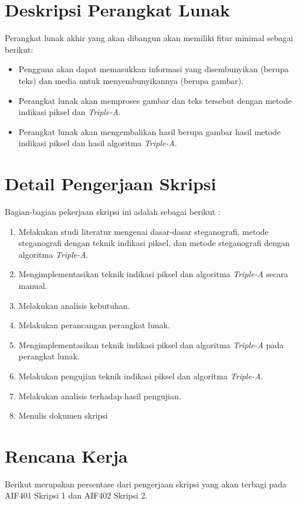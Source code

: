 \documentclass[a4paper,twoside]{article}
\begin{document}
\section{Deskripsi Perangkat Lunak}
Perangkat lunak akhir yang akan dibangun akan memiliki fitur minimal sebagai berikut:
\begin{itemize}
	\item Pengguna akan dapat memasukkan informasi yang disembunyikan (berupa teks) dan media untuk menyembunyikannya (berupa gambar).
	\item Perangkat lunak akan memproses gambar dan teks tersebut dengan metode indikasi piksel dan \textit{Triple-A}.
	\item Perangkat lunak akan mengembalikan hasil berupa gambar hasil metode indikasi piksel dan hasil algoritma \textit{Triple-A}.
\end{itemize}

\section{Detail Pengerjaan Skripsi}
Bagian-bagian pekerjaan skripsi ini adalah sebagai berikut :
	\begin{enumerate}
		\item Melakukan studi literatur mengenai dasar-dasar steganografi, metode steganografi dengan teknik indikasi piksel, dan metode steganografi dengan algoritma \textit{Triple-A}.
		\item Mengimplementasikan teknik indikasi piksel dan algoritma \textit{Triple-A} secara manual.
		\item Melakukan analisis kebutuhan.
		\item Melakukan perancangan perangkat lunak.
		\item Mengimplementasikan teknik indikasi piksel dan algoritma \textit{Triple-A} pada perangkat lunak.
		\item Melakukan pengujian teknik indikasi piksel dan algoritma \textit{Triple-A}.
		\item Melakukan analisis terhadap hasil pengujian.
		\item Menulis dokumen skripsi
	\end{enumerate}

\section{Rencana Kerja}
Berikut merupakan persentase dari pengerjaan skripsi yang akan terbagi pada AIF401 Skripsi 1 dan AIF402 Skripsi 2.
\end{document}
